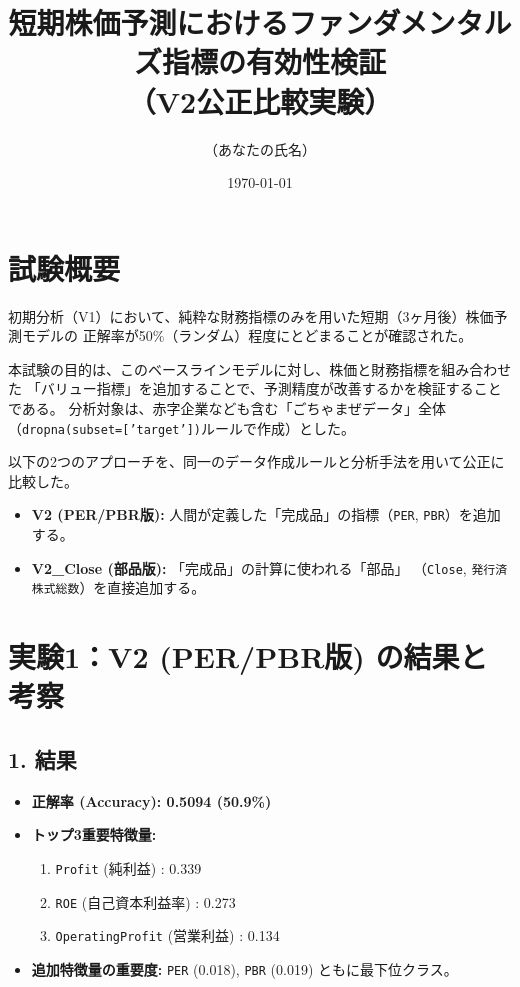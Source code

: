 \documentclass[a4paper, 11pt]{ltjsarticle}
\title{短期株価予測におけるファンダメンタルズ指標の有効性検証\\（V2公正比較実験）}
\author{（あなたの氏名）}
\date{\today}
\begin{document}
\maketitle

\section{試験概要}
初期分析（V1）において、純粋な財務指標のみを用いた短期（3ヶ月後）株価予測モデルの
正解率が50\%（ランダム）程度にとどまることが確認された。

本試験の目的は、このベースラインモデルに対し、株価と財務指標を組み合わせた
「バリュー指標」を追加することで、予測精度が改善するかを検証することである。
分析対象は、赤字企業なども含む「ごちゃまぜデータ」全体
（\texttt{dropna(subset=['target'])}ルールで作成）とした。

以下の2つのアプローチを、同一のデータ作成ルールと分析手法を用いて公正に比較した。
\begin{itemize}
    \item \textbf{V2 (PER/PBR版):} 人間が定義した「完成品」の指標（\texttt{PER}, \texttt{PBR}）を追加する。
    \item \textbf{V2\_Close (部品版):} 「完成品」の計算に使われる「部品」
    （\texttt{Close}, \texttt{発行済株式総数}）を直接追加する。
\end{itemize}

\section{実験1：V2 (PER/PBR版) の結果と考察}
\subsection*{1. 結果}
\begin{itemize}
    \item \textbf{正解率 (Accuracy): 0.5094 (50.9\%)}
    \item \textbf{トップ3重要特徴量:}
    \begin{enumerate}
        \item \texttt{Profit} (純利益) : 0.339
        \item \texttt{ROE} (自己資本利益率) : 0.273
        \item \texttt{OperatingProfit} (営業利益) : 0.134
    \end{enumerate}
    \item \textbf{追加特徴量の重要度:} \texttt{PER} (0.018), \texttt{PBR} (0.019) ともに最下位クラス。
\end{itemize}
\end{document}
